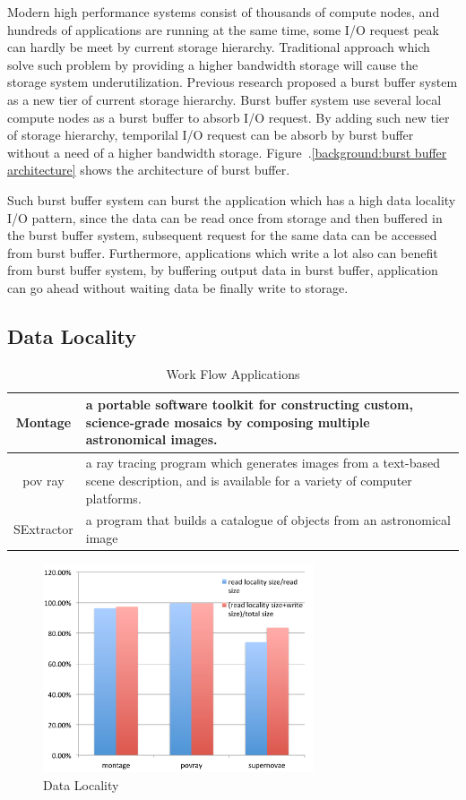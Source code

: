 Modern high performance systems consist of thousands of compute nodes, and hundreds of
applications are running at the same time, some I/O request peak can hardly be meet by current
storage hierarchy. 
Traditional approach which solve such problem by providing a higher bandwidth storage will cause
the storage system underutilization.
Previous research\cite{on_the_role_of_burst_buffers} proposed a
burst buffer system as a new tier of current storage hierarchy.
Burst buffer system use several local compute nodes as a burst buffer to absorb I/O
request. 
By adding such new tier of storage hierarchy, temporilal I/O request can be absorb by burst buffer
without a need of a higher bandwidth storage. Figure~.\ref{background:burst buffer architecture}
shows the architecture of burst buffer.

Such burst buffer system can burst the application which has a high data locality I/O pattern, since
the data can be read once from storage and then buffered in the burst buffer system, subsequent
request for the same data can be accessed from burst buffer.
Furthermore, applications which write a lot also can benefit from burst buffer system, by buffering
output data in burst buffer, application can go ahead without waiting data be finally write to
storage.

\subsection{Data Locality}

\begin{table}
\centering
\begin{tabular}{|c|p{150pt}|}
\hline
Montage		&		a portable software toolkit for constructing custom, science-grade 
mosaics by composing multiple astronomical images\cite{montage}.\\\hline
pov ray		&		a ray tracing program which generates images from a text-based scene description, and is
available for a variety of computer platforms\cite{povray}.\\\hline
SExtractor	&	a program that builds a catalogue of objects from an astronomical image	\\
\hline
\end{tabular}
\caption{Work Flow Applications}
\label{background:work flow applications}
\end{table}

\begin{figure}
\centering
\includegraphics[width=8cm]{img/data_locality.pdf}
\caption{Data Locality}
\label{background:data locality}
\end{figure}

